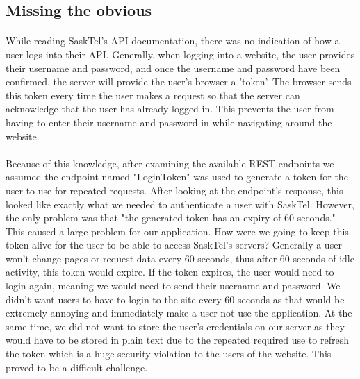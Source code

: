 \documentclass[12pt]{article}
\begin{document}
\subsection{Missing the obvious}
\paragraph{}	
	While reading SaskTel's API documentation, there was no indication of how a user logs into their API. Generally, when logging into a website, the user provides their username and password, and once the username and password have been confirmed, the server will provide the user's browser a 'token'. The browser sends this token every time the user makes a request so that the server can acknowledge that the user has already logged in. This prevents the user from having to enter their username and password in while navigating around the website. 
\paragraph{}
	Because of this knowledge, after examining the available REST endpoints we assumed the endpoint named "LoginToken" was used to generate a token for the user to use for repeated requests. After looking at the endpoint's response, this looked like exactly what we needed to authenticate a user with SaskTel. However, the only problem was that "the generated token has an expiry of 60 seconds." This caused a large problem for our application. How were we going to keep this token alive for the user to be able to access SaskTel's servers? Generally a user won't change pages or request data every 60 seconds, thus after 60 seconds of idle activity, this token would expire. If the token expires, the user would need to login again, meaning we would need to send their username and password. We didn't want users to have to login to the site every 60 seconds as that would be extremely annoying and immediately make a user not use the application. At the same time, we did not want to store the user's credentials on our server as they would have to be stored in plain text due to the repeated required use to refresh the token which is a huge security violation to the users of the website. This proved to be a difficult challenge. 
\end{document}
